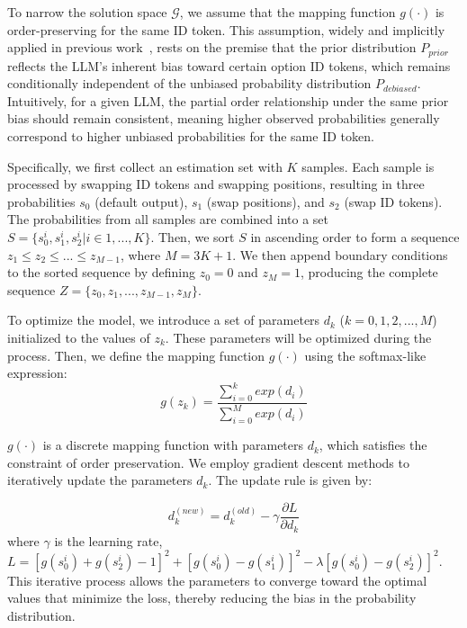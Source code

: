\documentclass[sigconf]{acmart}
\begin{document}
To narrow the solution space $\mathcal{G}$, we assume that the mapping function $g(\cdot)$ is order-preserving for the same ID token. 
This assumption, widely and implicitly applied in previous work~\cite{zheng2023large,zhao2021calibrate}, rests on the premise that the prior distribution $P_{prior}$ reflects the LLM's inherent bias toward certain option ID tokens, which remains conditionally independent of the unbiased probability distribution $P_{debiased}$.
Intuitively, for a given LLM, the partial order relationship under the same prior bias should remain consistent, meaning higher observed probabilities generally correspond to higher unbiased probabilities for the same ID token.

Specifically, we first collect an estimation set with $K$ samples.
Each sample is processed by swapping ID tokens and swapping positions, resulting in three probabilities $s_0$ (default output), $s_1$ (swap positions), and $s_2$ (swap ID tokens).
The probabilities from all samples are combined into a set $S = \{s^i_0, s^i_1, s^i_2 | i \in {1, ..., K}\}$. Then, we sort $S$ in ascending order to form a sequence $z_1 \leq z_2 \leq ... \leq z_{M-1}$, where $M = 3K + 1$. We then append boundary conditions to the sorted sequence by defining $z_0=0$ and $z_{M} = 1$, producing the complete sequence $Z = \{z_0,z_1,...,z_{M-1},z_{M}\}$.

To optimize the model, we introduce a set of parameters $d_k$ ($k=0,1,2, ..., M$) initialized to the values of $z_k$.
These parameters will be optimized during the process.
Then, we define the mapping function $g(\cdot)$ using the softmax-like expression:
\begin{equation}\label{eqn-12} 
g(z_k) = \frac{\sum_{i=0}^{k}exp(d_i) }{  {\textstyle \sum_{i=0}^{M}} exp(d_i)}
\end{equation}

$g(\cdot)$  is a discrete mapping function with parameters $d_k$, which satisfies the constraint of order preservation.
We employ gradient descent methods to iteratively update the parameters $d_k$. The update rule is given by:

\begin{equation}\label{eqn-13} 
d_k^{(new)} = d_k^{(old)} - \gamma \frac{\partial L}{\partial d_k} 
\end{equation}
where $\gamma$ is the learning rate, $L =[g(s_{0}^{i}) + g(s_2^i)-1]^2+[ g(s_{0}^{i}) - g(s_1^i)]^2-\lambda[ g(s_{0}^{i}) - g(s_2^i)]^2$. 
This iterative process allows the parameters to converge toward the optimal values that minimize the loss, thereby reducing the bias in the probability distribution.
\end{document}
